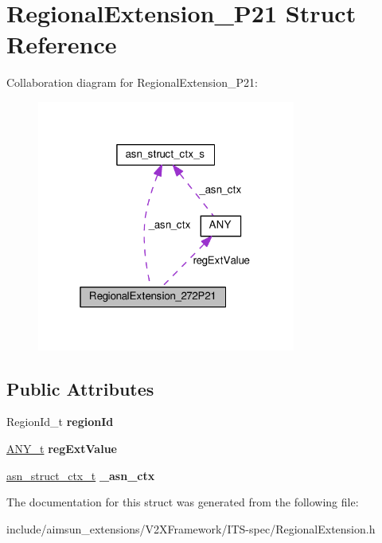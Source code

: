 \hypertarget{structRegionalExtension__272P21}{}\section{Regional\+Extension\+\_\+P21 Struct Reference}
\label{structRegionalExtension__272P21}


Collaboration diagram for Regional\+Extension\+\_\+P21\+:\nopagebreak
\begin{figure}[H]
\begin{center}
\leavevmode
\includegraphics[width=241pt]{structRegionalExtension__272P21__coll__graph}
\end{center}
\end{figure}
\subsection*{Public Attributes}
\begin{DoxyCompactItemize}
\item 
Region\+Id\+\_\+t {\bfseries region\+Id}\hypertarget{structRegionalExtension__272P21_a5fa092480692f323c3cf5b24d9b97780}{}\label{structRegionalExtension__272P21_a5fa092480692f323c3cf5b24d9b97780}

\item 
\hyperlink{structANY}{A\+N\+Y\+\_\+t} {\bfseries reg\+Ext\+Value}\hypertarget{structRegionalExtension__272P21_a7070ad47953acfe3b6b8591ff9c8364c}{}\label{structRegionalExtension__272P21_a7070ad47953acfe3b6b8591ff9c8364c}

\item 
\hyperlink{structasn__struct__ctx__s}{asn\+\_\+struct\+\_\+ctx\+\_\+t} {\bfseries \+\_\+asn\+\_\+ctx}\hypertarget{structRegionalExtension__272P21_a076eb84fe38e98efd1767b1eac3caf6f}{}\label{structRegionalExtension__272P21_a076eb84fe38e98efd1767b1eac3caf6f}

\end{DoxyCompactItemize}


The documentation for this struct was generated from the following file\+:\begin{DoxyCompactItemize}
\item 
include/aimsun\+\_\+extensions/\+V2\+X\+Framework/\+I\+T\+S-\/spec/Regional\+Extension.\+h\end{DoxyCompactItemize}
